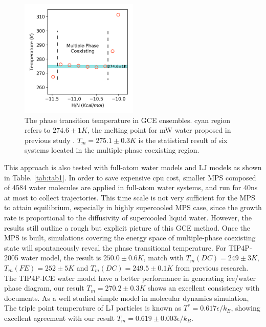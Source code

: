\documentclass[aps,prl,twocolumn,superscriptaddress]{revtex4-1}
\begin{document}
 \begin{figure}[ht]
\centering{}\includegraphics[width=0.5\textwidth]{PTtemp-mw.png} 
\caption{The phase transition temperature in GCE ensembles. cyan region refers to $274.6\pm1K$, the melting point for mW water proposed in previous study \cite{Molinero2009}. $T_m=275.1\pm0.3K$ is the statistical result of six systems located in the multiple-phase coexisting region.
\label{fig:PTtemp-mw}} 
\end{figure}

This approach is also tested with full-atom water models and LJ models as shown in Table. \ref{tab:tab1}. In order to save expensive cpu cost, smaller MPS composed of 4584 water molecules are applied in full-atom water systems, and run for 40ns at most to collect trajectories. This time scale is not very sufficient for the MPS to attain equilibrium, especially in highly supercooled MPS case, since the growth rate is proportional to the diffusivity of supercooled liquid water\cite{Tanaka2003}. However, the results still outline a rough but explicit picture of this GCE method. Once the MPS is built, simulations covering the energy space of multiple-phase coexisting state will spontaneously reveal the phase transitional temperature. For TIP4P-2005 water model, the result is $250.0\pm0.6K$, match with $T_m(DC)=249\pm3K$, $T_m(FE)=252\pm5K$ and $T_m(DC)=249.5\pm0.1K$ from previous research\cite{Conde2013,Conde2017}. The TIP4P-ICE water model have a better performance in generating ice/water phase diagram, our result $T_m=270.2\pm0.3K$ shows an excellent consistency with documents\cite{Conde2017,Abascal2005}. As a well studied simple model in molecular dynamics simulation, The triple point temperature of LJ particles is known as $T^*=0.617\epsilon/k_B$, showing excellent agreement with our result  $T_m=0.619\pm0.003\epsilon/k_B$. 

\newcommand{\tabincell}[2]{\begin{tabular}{@{}#1@{}}#2\end{tabular}}  
\end{document}
